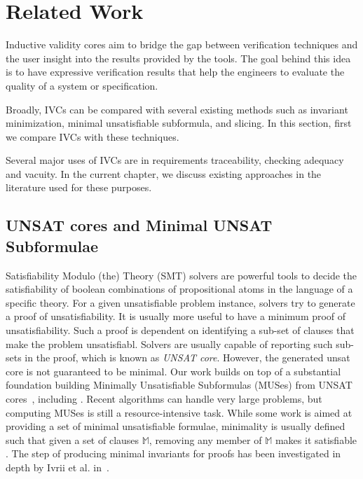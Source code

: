 \chapter{Related Work}
\label{sec:relatedWork}
Inductive validity cores aim to bridge the gap between verification techniques and the user insight into the results provided by the tools. The goal behind this idea is to have expressive verification results that help the engineers to evaluate the quality of a system or specification.

Broadly, IVCs can be compared with several existing methods such as invariant minimization, minimal unsatisfiable subformula, and slicing. In this section, first we compare IVCs with these techniques.

Several major uses of IVCs are in requirements traceability, checking adequacy and vacuity. In the current chapter, we discuss existing approaches in the literature used for these purposes.

\section{UNSAT cores and Minimal UNSAT Subformulae}
Satisfiability Modulo (the) Theory (SMT) solvers are powerful tools to decide the
satisfiability of boolean combinations
of propositional atoms in the language of a specific theory. For a given unsatisfiable problem instance, solvers try to generate a proof of unsatisfiability. It is usually more useful to have a minimum proof of unsatisfiability. Such a proof is dependent on identifying a sub-set of clauses that make the problem unsatisfiabl. Solvers are usually capable of reporting such sub-sets in the proof, which is known as \emph{UNSAT core}. However, the generated unsat core is not guaranteed to be minimal.
Our work builds on top of a substantial foundation building Minimally Unsatisfiable Subformulas
(MUSes) from UNSAT cores~\cite{Cimatti2007:UNSAT}, including \cite{marques2010minimal, belov2012towards, ryvchin2011faster, belov2012computing, nadel2010boosting}.  Recent algorithms can handle very large problems, but computing MUSes is still a resource-intensive task.  While some work is aimed at providing a set of minimal unsatisfiable formulae, minimality is usually defined such that given a set of clauses $\mathbb{M}$, removing any member of $\mathbb{M}$ makes it satisfiable \cite{belov2012computing}.  The step of producing minimal invariants for proofs has been investigated in depth by Ivrii et al. in~\cite{Ivrii14:invariants}.

